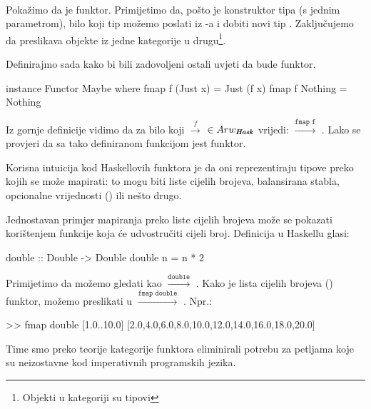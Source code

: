  \begin{example}\ \\
 
    \noindent Pokažimo da je  funktor.
    Primijetimo da, pošto je  konstruktor tipa (s jednim
    parametrom), bilo koji tip  možemo poslati iz -a i
    dobiti novi tip . Zaključujemo da 
    preslikava objekte iz jedne kategorije u drugu\footnote{Objekti u
      kategoriji  su tipovi}.

    Definirajmo sada  kako bi bili zadovoljeni ostali uvjeti da
     bude funktor.
    \begin{mcode}
      instance Functor Maybe where
        fmap f (Just x) = Just (f x)
        fmap f Nothing = Nothing
    \end{mcode}
    Iz gornje definicije vidimo da za bilo koji  $\xrightarrow{f}$
     $\in
    Arw_{\textbf{\emph{Hask}}}$ vrijedi: 
    $\xrightarrow{\texttt{fmap f}}$ .
    Lako se provjeri da sa tako definiranom funkcijom  
     jest funktor.
\end{example}

  Korisna intuicija kod Haskellovih funktora je da oni reprezentiraju tipove
  preko kojih se može mapirati: to mogu biti liste cijelih brojeva,
  balansirana stabla, opcionalne vrijednosti () ili nešto drugo.

  Jednostavan primjer mapiranja preko liste cijelih brojeva može se pokazati
  korištenjem funkcije  koja će udvostručiti cijeli broj.
  Definicija  u Haskellu glasi:
  \begin{mcode}
    double :: Double -> Double
    double n = n * 2
  \end{mcode}
  Primijetimo da  možemo gledati kao 
  $\xrightarrow{\texttt{double}}$ . Kako je lista cijelih brojeva (\codei{[Double]}) funktor, možemo preslikati  
  u \codei{[Double]} $\xrightarrow{\texttt{fmap double}}$
  \codei{[Double]}. Npr.:
  \begin{mcode}
    >> fmap double [1.0..10.0]
    [2.0,4.0,6.0,8.0,10.0,12.0,14.0,16.0,18.0,20.0]
    \end{mcode}

\vspace{\baselineskip}

 	Time smo preko teorije kategorije funktora eliminirali potrebu za
  petljama koje su neizostavne kod imperativnih programskih jezika.
  \newpage


